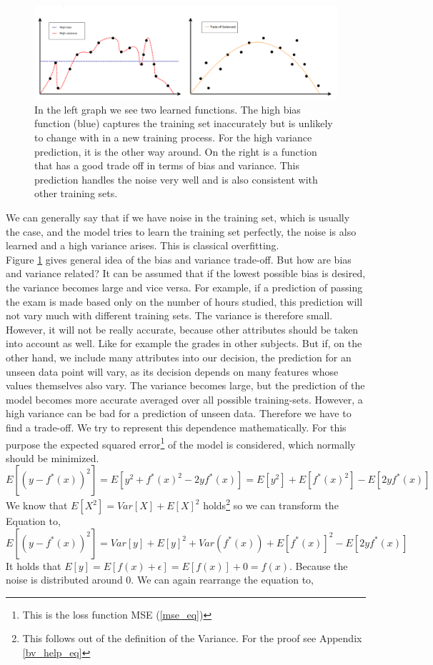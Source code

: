 \begin{figure}[!htp]
\centering
\includegraphics[scale=0.3]{Abschlussarbeit_2021/LaTeX/images/balances_function.PNG}
\caption{In the left graph we see two learned functions. The high bias function (blue) captures the training set inaccurately but is unlikely to change with in a new training process. For the high variance prediction, it is the other way around. On the right is a function that has a good trade off in terms of bias and variance. This prediction handles the noise very well and is also consistent with other training sets. }
\label{bias_variance}
\end{figure}

 We can generally say that if we have noise in the training set, which is usually the case, and the model tries to learn the training set perfectly, the noise is also learned and a high variance arises. This is classical overfitting.\\
Figure \ref{bias_variance} gives general idea of  the bias and variance trade-off. But how are bias and variance related? It can be assumed that if the lowest possible bias is desired, the variance becomes large and vice versa. For example, if a prediction of passing the exam is made based only on the number of hours studied, this prediction will not vary much with different training sets. The variance is therefore small. However, it will not be really accurate, because other attributes should be taken into account as well. Like for example the grades in other subjects. But if, on the other hand, we include many attributes into our decision, the prediction for an unseen data point will vary, as its decision depends on many features whose values themselves also vary. The variance becomes large, but the prediction of the model becomes more accurate averaged over all possible training-sets. However, a high variance can be bad for a prediction of unseen data. Therefore we have to find a trade-off. We try to represent this dependence mathematically. For this purpose the expected squared error\footnote{This is the loss function MSE (\ref{mse_eq})} of the model is considered, which normally should be minimized. 
$$
E[(y - f^*(x))^2] = E[y^2 + f^*(x)^2 - 2yf^*(x)] = E[y^2] + E[f^*(x)^2] - E[2yf^*(x)]
$$
We know that $E[X^2] = Var[X] + E[X]^2$ holds\footnote{This follows out of the definition of the Variance. For the proof see Appendix \ref{bv_help_eq}} so we can transform the Equation to, %
$$
E[(y - f^*(x))^2] = Var[y] + E[y]^2 + Var(f^*(x)) + E[f^*(x)]^2 - E[2yf^*(x)]
$$
It holds that $E[y] = E[f(x) + \epsilon] = E[f(x)] + 0 = f(x)$. Because the noise is distributed around $0$. We can again rearrange the equation to,

